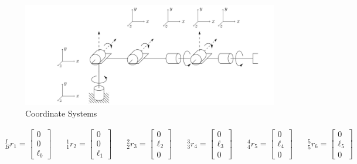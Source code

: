 \documentclass[12pt]{report}
\begin{document}
\newpage


\begin{figure}[htp]
  \centering
  \includegraphics[width=.9\textwidth]{zero}
  \caption{Coordinate Systems}
  \label{fig:coords}
\end{figure}




\[
\begin{aligned}
  ^I_Br_1 = \begin{bmatrix} 0\\0\\ \ell_b\end{bmatrix} & \quad
  ^1_1r_2 = \begin{bmatrix} 0\\0\\ \ell_1\end{bmatrix} & \quad
  ^2_2r_3 = \begin{bmatrix} 0\\\ell_2\\ 0\end{bmatrix} & \quad
  ^3_3r_4 = \begin{bmatrix} 0\\\ell_3\\ 0\end{bmatrix} & \quad
  ^4_4r_5 = \begin{bmatrix} 0\\\ell_4\\ 0\end{bmatrix} & \quad
  ^5_5r_6 = \begin{bmatrix} 0\\\ell_5\\ 0\end{bmatrix} & \quad
\end{aligned}
\]
\end{document}
